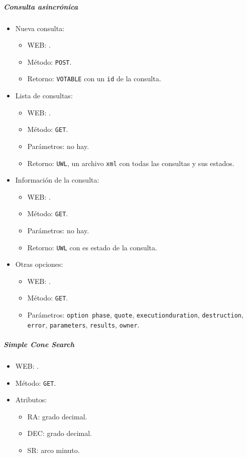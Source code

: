 \subparagraph{Consulta asincrónica}

\begin{itemize}
	\item Nueva consulta:
		\begin{itemize}
			\item WEB: \url{}.
			\item M\'etodo: \verb;POST;.
			\item Retorno: \verb;VOTABLE; con un \verb;id; de la consulta.
		\end{itemize}
	\item Lista de consultas:
		\begin{itemize}
			\item WEB: \url{}.
			\item M\'etodo: \verb;GET;.
			\item Parámetros: no hay.
			\item Retorno: \verb;UWL;, un archivo \verb;xml; con todas las consultas y sus estados.
		\end{itemize}
	\item Información de la consulta:
		\begin{itemize}
			\item WEB: \url{}.
			\item M\'etodo: \verb;GET;.
			\item Parámetros: no hay.
			\item Retorno: \verb;UWL; con es estado de la consulta.
		\end{itemize}
	\item Otras opciones:
		\begin{itemize}
			\item WEB: \url{}.
			\item M\'etodo: \verb;GET;.
			\item Parámetros: \verb;option phase;, \verb;quote;, \verb;executionduration;, \verb;destruction;, \verb;error;, \verb;parameters;, \verb;results;, \verb;owner;.
		\end{itemize}
\end{itemize}

\subparagraph{Simple Cone Search}

\begin{itemize}
	\item WEB: \url{}.
	\item M\'etodo: \verb;GET;.
	\item Atributos: 
		\begin{itemize}
			\item RA: grado decimal.
			\item DEC: grado decimal.
			\item SR: arco minuto.
		\end{itemize}
\end{itemize}

